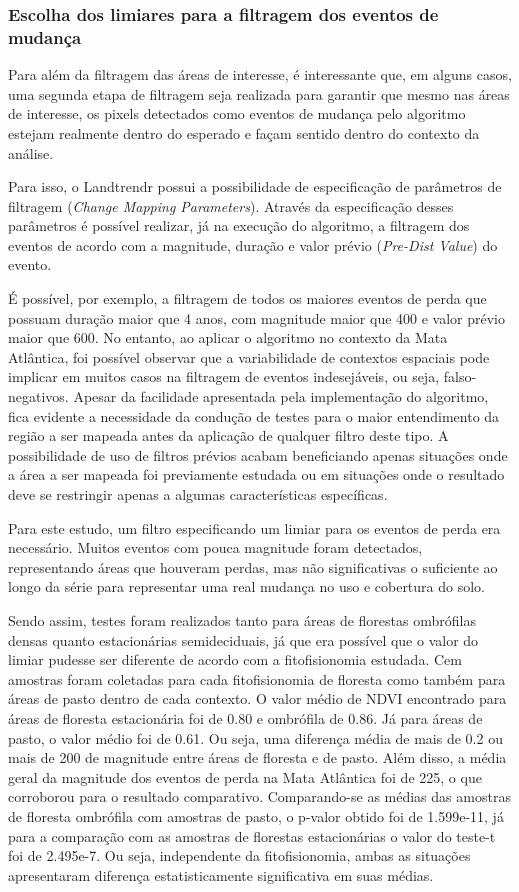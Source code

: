 \subsubsection{Escolha dos limiares para a filtragem dos eventos de mudança}
\hspace{13pt} Para além da filtragem das áreas de interesse, é interessante que, em alguns casos, uma segunda etapa de filtragem seja realizada para garantir que mesmo nas áreas de interesse, os pixels detectados como eventos de mudança pelo algoritmo estejam realmente dentro do esperado e façam sentido dentro do contexto da análise. 

Para isso, o Landtrendr possui a possibilidade de especificação de parâmetros de filtragem (\textit{Change Mapping Parameters}). Através da especificação desses parâmetros é possível realizar, já na execução do algoritmo, a filtragem dos eventos de acordo com a magnitude, duração e valor prévio (\textit{Pre-Dist Value}) do evento. 

É possível, por exemplo, a filtragem de todos os maiores eventos de perda que possuam duração maior que 4 anos, com magnitude maior que 400 e valor prévio maior que 600. No entanto, ao aplicar o algoritmo no contexto da Mata Atlântica, foi possível observar que a variabilidade de contextos espaciais pode implicar em muitos casos na filtragem de eventos indesejáveis, ou seja, falso-negativos. Apesar da facilidade apresentada pela implementação do algoritmo, fica evidente a necessidade da condução de testes para o maior entendimento da região a ser mapeada antes da aplicação de qualquer filtro deste tipo. A possibilidade de uso de filtros prévios acabam beneficiando apenas situações onde a área a ser mapeada foi previamente estudada ou em situações onde o resultado deve se restringir apenas a algumas características específicas.

Para este estudo, um filtro especificando um limiar para os eventos de perda era necessário. Muitos eventos com pouca magnitude foram detectados, representando áreas que houveram perdas, mas não significativas o suficiente ao longo da série para representar uma real mudança no uso e cobertura do solo.   

Sendo assim, testes foram realizados tanto para áreas de florestas ombrófilas densas quanto estacionárias semideciduais, já que era possível que o valor do limiar pudesse ser diferente de acordo com a fitofisionomia estudada. Cem amostras foram coletadas para cada fitofisionomia de floresta como também para áreas de pasto dentro de cada contexto. O valor médio de NDVI encontrado para áreas de floresta estacionária foi de 0.80 e ombrófila de 0.86. Já para áreas de pasto, o valor médio foi de 0.61. Ou seja, uma diferença média de mais de 0.2 ou mais de 200 de magnitude entre áreas de floresta e de pasto. Além disso, a média geral da magnitude dos eventos de perda na Mata Atlântica foi de 225, o que corroborou para o resultado comparativo. Comparando-se as médias das amostras de floresta ombrófila com amostras de pasto, o p-valor obtido foi de 1.599e-11, já para a comparação com as amostras de florestas estacionárias o valor do teste-t foi de 2.495e-7. Ou seja, independente da fitofisionomia, ambas as situações apresentaram diferença estatisticamente significativa em suas médias.

